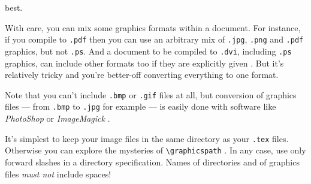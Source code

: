 best.
\par
With care, you can mix some graphics formats within a document. For
instance, if you compile to \texttt{.pdf} then you can use an
arbitrary mix of \texttt{.jpg}, \texttt{.png} and \texttt{.pdf}
graphics, but not \texttt{.ps}. And a document to be compiled to
\texttt{.dvi}, including \texttt{.ps} graphics, can include other
formats too if they are explicitly given . But
it's relatively tricky and you're better-off converting everything to
one format.
\par
Note that you can't include \texttt{.bmp} or \texttt{.gif} files at
all, but conversion of graphics files --- from \texttt{.bmp} to
\texttt{.jpg} for example --- is easily done with software like
\textsl{PhotoShop} \cite{PS} or \textsl{ImageMagick} \cite{IM}.
\par
It's simplest to keep your image files in the same directory as your
\texttt{.tex} files. Otherwise you can explore the mysteries of
\verb+\graphicspath+ \cite[Sec.~10.2.5]{MG}. In any case, use only
forward slashes in a directory specification. Names of directories and
of graphics files \textit{must not} include spaces!
%
